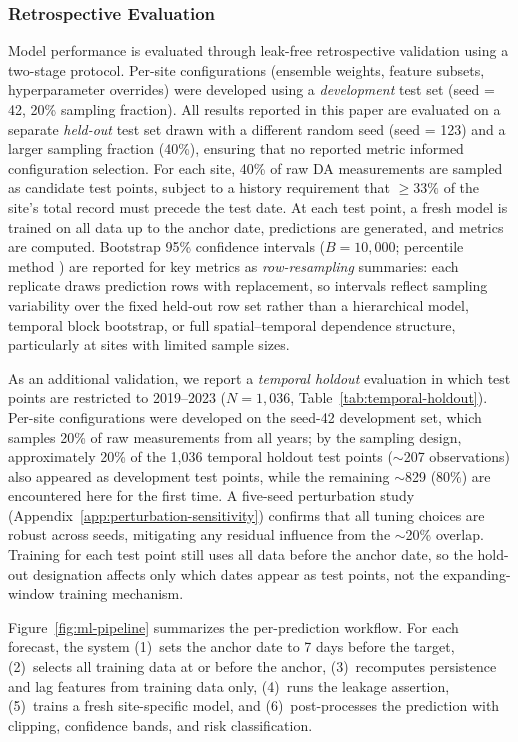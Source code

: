\documentclass[toxins,article,submit,moreauthors]{Definitions/mdpi}
\begin{document}
\subsubsection{Retrospective Evaluation}

Model performance is evaluated through leak-free retrospective validation using a two-stage protocol. Per-site configurations (ensemble weights, feature subsets, hyperparameter overrides) were developed using a \textit{development} test set (seed = 42, 20\% sampling fraction). All results reported in this paper are evaluated on a separate \textit{held-out} test set drawn with a different random seed (seed = 123) and a larger sampling fraction (40\%), ensuring that no reported metric informed configuration selection. For each site, 40\% of raw DA measurements are sampled as candidate test points, subject to a history requirement that $\geq 33\%$ of the site's total record must precede the test date. At each test point, a fresh model is trained on all data up to the anchor date, predictions are generated, and metrics are computed. Bootstrap 95\% confidence intervals ($B = 10{,}000$; percentile method \cite{Efron1979}) are reported for key metrics as \emph{row-resampling} summaries: each replicate draws prediction rows with replacement, so intervals reflect sampling variability over the fixed held-out row set rather than a hierarchical model, temporal block bootstrap, or full spatial--temporal dependence structure, particularly at sites with limited sample sizes.

As an additional validation, we report a \textit{temporal holdout} evaluation in which test points are restricted to 2019--2023 ($N = 1{,}036$, Table~\ref{tab:temporal-holdout}). Per-site configurations were developed on the seed-42 development set, which samples 20\% of raw measurements from all years; by the sampling design, approximately 20\% of the 1,036 temporal holdout test points ($\sim$207 observations) also appeared as development test points, while the remaining $\sim$829 (80\%) are encountered here for the first time. A five-seed perturbation study (Appendix~\ref{app:perturbation-sensitivity}) confirms that all tuning choices are robust across seeds, mitigating any residual influence from the $\sim$20\% overlap. Training for each test point still uses all data before the anchor date, so the hold-out designation affects only which dates appear as test points, not the expanding-window training mechanism.

Figure~\ref{fig:ml-pipeline} summarizes the per-prediction workflow. For each forecast, the system (1)~sets the anchor date to 7 days before the target, (2)~selects all training data at or before the anchor, (3)~recomputes persistence and lag features from training data only, (4)~runs the leakage assertion, (5)~trains a fresh site-specific model, and (6)~post-processes the prediction with clipping, confidence bands, and risk classification.
\end{document}
